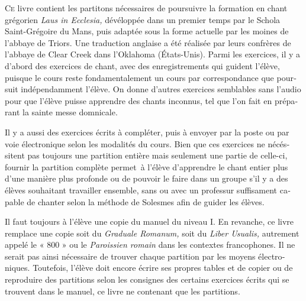 \begin{otherlanguage}{french}
\lettrine{C}{e} livre contient les partitons nécessaires de poursuivre la formation en chant grégorien \textit{Laus in Ecclesia,} dévéloppée dans un premier temps par le Schola Saint-Grégoire du Mans, puis adaptée sous la forme actuelle par les moines de l'abbaye de Triors. Une traduction anglaise a été réalisée par leurs confrères de l'abbaye de Clear Creek dans l'Oklahoma (États-Unis). Parmi les exercices, il y a d'abord des exercices de chant, avec des enregistrements qui guident l'élève, puisque le cours reste fondamentalement un cours par correspondance que poursuit indépendamment l'élève. On donne d'autres exercices semblables sans l'audio pour que l'élève puisse apprendre des chants inconnus, tel que l'on fait en préparant la sainte messe domnicale.

Il y a aussi des exercices écrits à compléter, puis à envoyer par la poste ou par voie électronique selon les modalités du cours. Bien que ces exercices ne nécéssitent pas toujours une partition entière mais seulement une partie de celle-ci, fournir la partition complète permet à l'élève d'apprendre le chant entier plus d'une manière plus profonde ou de pouvoir le faire dans un groupe s'il y a des élèves souhaitant travailler ensemble, sans ou avec un professur suffisament capable de chanter selon la méthode de Solesmes afin de guider les élèves.

Il faut toujours à l'élève une copie du manuel du niveau I. En revanche, ce livre remplace une copie soit du \textit{Graduale Romanum,} soit du \textit{Liber Usualis,} autrement appelé le « 800 » ou le \textit{Paroissien romain} dans les contextes francophones. Il ne serait pas ainsi nécessaire de trouver chaque partition par les moyens électroniques. Toutefois, l'élève doit encore écrire ses propres tables et de copier ou de reproduire des partitions selon les consignes des certains exercices écrits qui se trouvent dans le manuel, ce livre ne contenant que les partitions.
\end{otherlanguage} 

 \clearpage\thispagestyle{empty}